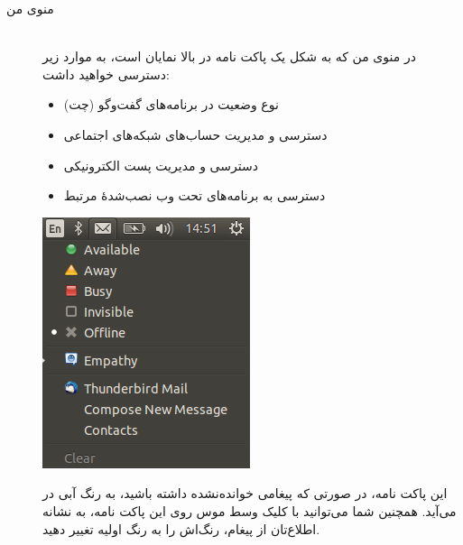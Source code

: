 \begin{description}
\item[منوی من] \hfill \\
در منوی من که به شکل یک پاکت نامه در بالا نمایان است، به موارد زیر دسترسی خواهید داشت:
\begin{itemize}
\item نوع وضعیت در برنامه‌های گفت‌وگو (چت)
\item دسترسی و مدیریت حساب‌های شبکه‌های اجتماعی
\item دسترسی و مدیریت پست الکترونیکی
\item دسترسی به برنامه‌های تحت وب نصب‌شدهٔ مرتبط
\end{itemize}

\begin{center}
\includegraphics[scale=0.5]{pics/18.png}
\end{center}

این پاکت نامه، در صورتی که پیغامی خوانده‌نشده داشته باشید، به رنگ آبی در می‌آید. همچنین شما می‌توانید با کلیک وسط موس روی این پاکت نامه، به نشانه اطلاع‌تان از پیغام، رنگ‌اش را به رنگ اولیه تغییر دهید.



\end{description}
